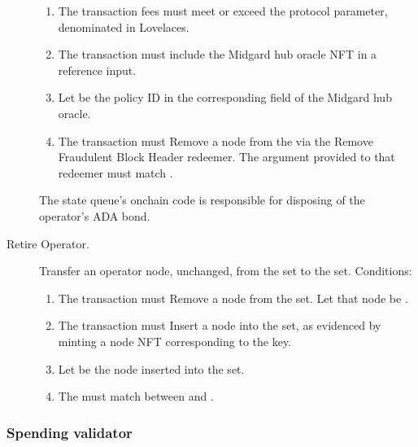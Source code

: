 \documentclass[../midgard.tex]{subfiles}
\begin{document}
\begin{description}
\begin{enumerate}
            \item The transaction fees must meet or exceed the  protocol parameter, denominated in Lovelaces.
            \item The transaction must include the Midgard hub oracle NFT in a reference input.
            \item Let  be the policy ID in the corresponding field of the Midgard hub oracle.
            \item The transaction must Remove a node from the  via the Remove Fraudulent Block Header redeemer.
              The  argument provided to that redeemer must match .
        \end{enumerate}

        The state queue's onchain code is responsible for disposing of the operator's ADA bond.
    \item[Retire Operator.] Transfer an operator node, unchanged, from the  set to the  set.
      Conditions:
        \begin{enumerate}
            \item The transaction must Remove a node from the  set.
              Let that node be .
            \item The transaction must Insert a node into the  set, as evidenced by minting a  node NFT corresponding to the  key.
            \item Let  be the node inserted into the  set.
            \item The  must match between  and .
        \end{enumerate}
\end{description}

\subsubsection{Spending validator}
\label{h:active-operators-spending-validator}
\end{document}
